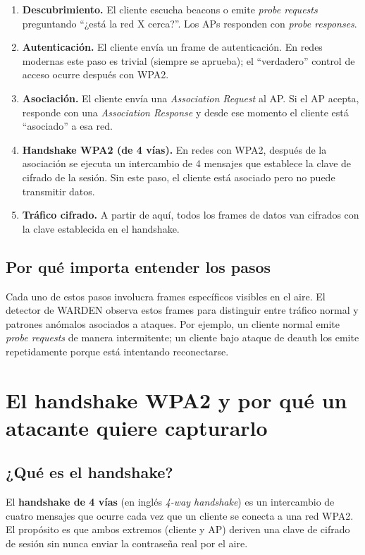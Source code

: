 \documentclass[11pt,a4paper]{article}
\begin{document}
\begin{enumerate}
  \item \textbf{Descubrimiento.} El cliente escucha beacons o emite
    \emph{probe requests} preguntando ``¿está la red X cerca?''. Los APs
    responden con \emph{probe responses}.
  \item \textbf{Autenticación.} El cliente envía un frame de autenticación.
    En redes modernas este paso es trivial (siempre se aprueba); el
    ``verdadero'' control de acceso ocurre después con WPA2.
  \item \textbf{Asociación.} El cliente envía una \emph{Association
    Request} al AP. Si el AP acepta, responde con una \emph{Association
    Response} y desde ese momento el cliente está ``asociado'' a esa red.
  \item \textbf{Handshake WPA2 (de 4 vías).} En redes con WPA2, después de
    la asociación se ejecuta un intercambio de 4 mensajes que establece la
    clave de cifrado de la sesión. Sin este paso, el cliente está asociado
    pero no puede transmitir datos.
  \item \textbf{Tráfico cifrado.} A partir de aquí, todos los frames de
    datos van cifrados con la clave establecida en el handshake.
\end{enumerate}

\subsection{Por qué importa entender los pasos}
Cada uno de estos pasos involucra frames específicos visibles en el aire.
El detector de WARDEN observa estos frames para distinguir entre tráfico
normal y patrones anómalos asociados a ataques. Por ejemplo, un cliente
normal emite \emph{probe requests} de manera intermitente; un cliente bajo
ataque de deauth los emite repetidamente porque está intentando reconectarse.

\section{El handshake WPA2 y por qué un atacante quiere capturarlo}

\subsection{¿Qué es el handshake?}
El \textbf{handshake de 4 vías} (en inglés \emph{4-way handshake}) es un
intercambio de cuatro mensajes que ocurre cada vez que un cliente se conecta
a una red WPA2. El propósito es que ambos extremos (cliente y AP) deriven
una clave de cifrado de sesión sin nunca enviar la contraseña real por el
aire.
\end{document}
